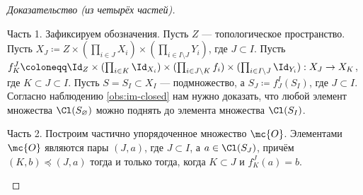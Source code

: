 \documentclass[
	extrafontsizes,
	11pt,
	hyphens,
]{memoir}
\begin{document}
\begin{proof}[Доказательство (из четырёх частей)]
~\begin{proofdescription}

\item[Часть 1.]
Зафиксируем обозначения.
Пусть \(Z\) --- топологическое пространство.
Пусть
\(
X_J \coloneqq
Z \times
(\prod_{i \in J} X_i)
\times
(\prod_{i \in I \setminus J} Y_i)
\),
где \(J \subset I\).
Пусть \(f^J_K \coloneqq \Id_Z \times (\prod_{i \in K} \Id_{X_i}) \times (\prod_{i \in J \setminus K} f_i) \times (\prod_{i \in I \setminus J} \Id_{Y_i}) : X_J \to X_K\), где \(K \subset J \subset I\).
Пусть \(S = S_I \subset X_I\) --- подмножество,
а \(S_J \coloneqq f^I_J(S_I)\), где \(J \subset I\).
Согласно наблюдению \ref{obs:im-closed} нам нужно доказать, что любой элемент множества \(\Cl(S_\varnothing)\) можно поднять до элемента множества \(\Cl(S_I)\).

\item[Часть 2.]
Построим частично упорядоченное множество \(\mc{O}\).
Элементами \(\mc{O}\) являются пары \((J,a)\), где \(J \subset I\), а \(a \in \Cl(S_J)\),
причём
\((K,b) \preccurlyeq (J,a)\)
тогда и только тогда, когда
\(K \subset J\) и \(f^J_K(a) = b\).


\end{proofdescription}
\end{proof}
\end{document}
